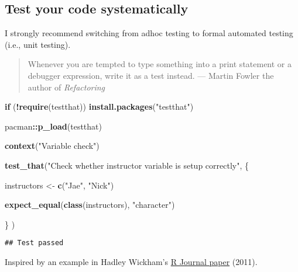 \documentclass[
]{book}
\newenvironment{Shaded}{\begin{snugshade}}{\end{snugshade}}
\newcommand{\ControlFlowTok}[1]{\textcolor[rgb]{0.13,0.29,0.53}{\textbf{#1}}}
\newcommand{\KeywordTok}[1]{\textcolor[rgb]{0.13,0.29,0.53}{\textbf{#1}}}
\newcommand{\NormalTok}[1]{#1}
\newcommand{\OperatorTok}[1]{\textcolor[rgb]{0.81,0.36,0.00}{\textbf{#1}}}
\newcommand{\StringTok}[1]{\textcolor[rgb]{0.31,0.60,0.02}{#1}}
\begin{document}
\hypertarget{test-your-code-systematically}{%
\subsection{Test your code systematically}\label{test-your-code-systematically}}

I strongly recommend switching from adhoc testing to formal automated testing (i.e., unit testing).

\begin{quote}
Whenever you are tempted to type something into a print statement or a debugger expression, write it as a test instead. --- Martin Fowler the author of \emph{Refactoring}
\end{quote}

\begin{Shaded}
\begin{Highlighting}[]
\ControlFlowTok{if}\NormalTok{ (}\OperatorTok{!}\KeywordTok{require}\NormalTok{(testthat)) }\KeywordTok{install.packages}\NormalTok{(}\StringTok{"testthat"}\NormalTok{)}

\NormalTok{pacman}\OperatorTok{::}\KeywordTok{p\_load}\NormalTok{(testthat)}

\KeywordTok{context}\NormalTok{(}\StringTok{"Variable check"}\NormalTok{)}

\KeywordTok{test\_that}\NormalTok{(}\StringTok{"Check whether instructor variable is setup correctly"}\NormalTok{, \{}
  
\NormalTok{  instructors \textless{}{-}}\StringTok{ }\KeywordTok{c}\NormalTok{(}\StringTok{"Jae"}\NormalTok{, }\StringTok{"Nick"}\NormalTok{)}

  \KeywordTok{expect\_equal}\NormalTok{(}\KeywordTok{class}\NormalTok{(instructors), }\StringTok{"character"}\NormalTok{)}

\NormalTok{\}}
\NormalTok{)}
\end{Highlighting}
\end{Shaded}

\begin{verbatim}
## Test passed
\end{verbatim}

Inspired by an example in Hadley Wickham's \href{https://journal.r-project.org/archive/2011-1/RJournal_2011-1_Wickham.pdf}{R Journal paper} (2011).
\end{document}

